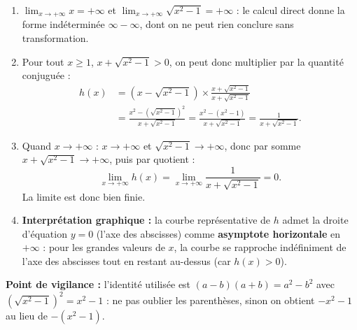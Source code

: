 \documentclass[11pt]{article}
\begin{document}
\begin{corrige}
\begin{enumerate}
\item $\lim_{x\to +\infty}x=+\infty$ et $\lim_{x\to +\infty}\sqrt{x^2-1}=+\infty$ : le calcul direct donne la forme indéterminée $\infty-\infty$, dont on ne peut rien conclure sans transformation.
\item Pour tout $x\geq 1$, $x+\sqrt{x^2-1}>0$, on peut donc multiplier par la quantité conjuguée :
\begin{align*}
h(x)&=(x-\sqrt{x^2-1})\times\frac{x+\sqrt{x^2-1}}{x+\sqrt{x^2-1}}\\
&=\frac{x^2-\left(\sqrt{x^2-1}\right)^2}{x+\sqrt{x^2-1}}=\frac{x^2-(x^2-1)}{x+\sqrt{x^2-1}}=\frac{1}{x+\sqrt{x^2-1}}.
\end{align*}
\item Quand $x\to +\infty$ : $x\to +\infty$ et $\sqrt{x^2-1}\to +\infty$, donc par somme $x+\sqrt{x^2-1}\to +\infty$, puis par quotient :
\[ \lim_{x\to +\infty}h(x)=\lim_{x\to +\infty}\frac{1}{x+\sqrt{x^2-1}}=\boxed{0}. \]
La limite est donc bien finie.
\item \textbf{Interprétation graphique :} la courbe représentative de $h$ admet la droite d'équation $y=0$ (l'axe des abscisses) comme \textbf{asymptote horizontale} en $+\infty$ : pour les grandes valeurs de $x$, la courbe se rapproche indéfiniment de l'axe des abscisses tout en restant au-dessus (car $h(x)>0$).
\end{enumerate}
\textbf{Point de vigilance :} l'identité utilisée est $(a-b)(a+b)=a^2-b^2$ avec $\left(\sqrt{x^2-1}\right)^2=x^2-1$ : ne pas oublier les parenthèses, sinon on obtient $-x^2-1$ au lieu de $-(x^2-1)$.
\end{corrige}
\end{document}
